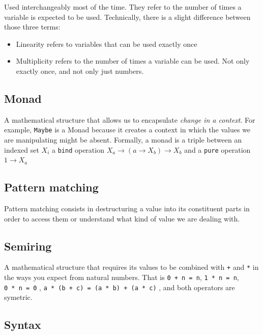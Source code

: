 \documentclass[
]{article}
\providecommand{\tightlist}{%
  \setlength{\itemsep}{0pt}\setlength{\parskip}{0pt}}
\begin{document}
Used interchangeably most of the time. They refer to the number of times
a variable is expected to be used. Technically, there is a slight
difference between those three terms:

\begin{itemize}
\tightlist
\item
  Linearity refers to variables that can be used exactly once
\item
  Multiplicity refers to the number of times a variable can be used. Not
  only exactly once, and not only just numbers.
\end{itemize}

\hypertarget{monad}{%
\subsection{Monad}\label{monad}}

A mathematical structure that allows us to encapsulate \emph{change in a
context}. For example, \texttt{Maybe} is a Monad because it creates a
context in which the values we are manipulating might be absent.
Formally, a monad is a triple between an indexed set \(X_i\) a
\texttt{bind} operation \(X_a \to (a \to X_b) \to X_b\) and a
\texttt{pure} operation \(1 \to X_a\)

\hypertarget{pattern-matching-1}{%
\subsection{Pattern matching}\label{pattern-matching-1}}

Pattern matching consists in destructuring a value into its constituent
parts in order to access them or understand what kind of value we are
dealing with.

\hypertarget{semiring}{%
\subsection{Semiring}\label{semiring}}

A mathematical structure that requires its values to be combined with
\texttt{+} and \texttt{*} in the ways you expect from natural numbers.
That is \texttt{0\ +\ n\ =\ n}, \texttt{1\ *\ n\ =\ n},
\texttt{0\ *\ n\ =\ 0} ,
\texttt{a\ *\ (b\ +\ c)\ =\ (a\ *\ b)\ +\ (a\ *\ c)} , and both
operators are symetric.

\hypertarget{syntax-1}{%
\subsection{Syntax}\label{syntax-1}}
\end{document}
